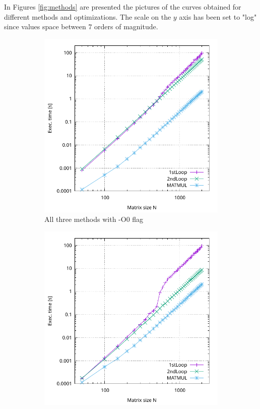 \documentclass[11pt,a4paper]{article}
\begin{document}
In Figures \ref{fig:methods} are presented the pictures of the curves obtained for different methods and optimizations. The scale on the $y$ axis has been set to "log" since values space between $7$ orders of magnitude.
\begin{figure}
	\centering
	\begin{subfigure}{0.47\textwidth}
		\includegraphics[width=1\linewidth]{Data/MethodsO0}
		\caption{All three methods with -O0 flag}
    	\label{fig:methodsO0}
	\end{subfigure}%
	\hfill
	\begin{subfigure}{0.47\textwidth}
		\includegraphics[width=1\linewidth]{Data/MethodsO2}

\end{subfigure}
\end{figure}
\end{document}

